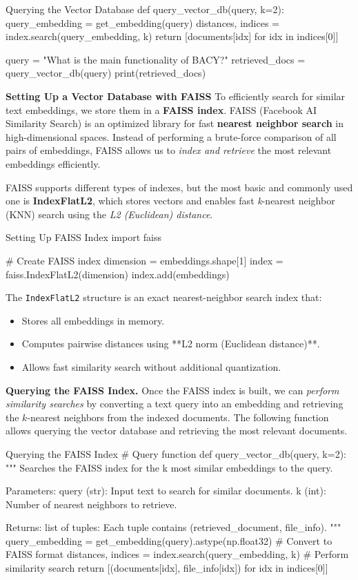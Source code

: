 \begin{codeonly}{Querying the Vector Database}
def query_vector_db(query, k=2):
    query_embedding = get_embedding(query)
    distances, indices = index.search(query_embedding, k)
    return [documents[idx] for idx in indices[0]]

query = "What is the main functionality of BACY?"
retrieved_docs = query_vector_db(query)
print(retrieved_docs)
\end{codeonly}

{\bf Setting Up a Vector Database with FAISS}
To efficiently search for similar text embeddings, we store them in a {\bf FAISS index}. FAISS (Facebook AI Similarity Search) is an optimized library for fast {\bf nearest neighbor search} in high-dimensional spaces. Instead of performing a brute-force comparison of all pairs of embeddings, FAISS allows us to {\em index and retrieve} the most relevant embeddings efficiently.

FAISS supports different types of indexes, but the most basic and commonly used one is 
\textbf{IndexFlatL2}, which stores vectors and enables fast \textit{k}-nearest neighbor (KNN) search using the {\em L2 (Euclidean) distance}.

\begin{codeonly}{Setting Up FAISS Index}
import faiss

# Create FAISS index
dimension = embeddings.shape[1]
index = faiss.IndexFlatL2(dimension)
index.add(embeddings)
\end{codeonly}

The \texttt{IndexFlatL2} structure is an exact nearest-neighbor search index that:
\begin{itemize}
    \item Stores all embeddings in memory.
    \item Computes pairwise distances using **L2 norm (Euclidean distance)**.
    \item Allows fast similarity search without additional quantization.
\end{itemize}

{\bf Querying the FAISS Index.} 
Once the FAISS index is built, we can {\em perform similarity searches} by converting a text query into an embedding and retrieving the \( k \)-nearest neighbors from the indexed documents. The following function allows querying the vector database and retrieving the most relevant documents.

\begin{codeonly}{Querying the FAISS Index}
# Query function
def query_vector_db(query, k=2):
    """
    Searches the FAISS index for the k most similar embeddings to the query.

    Parameters:
    query (str): Input text to search for similar documents.
    k (int): Number of nearest neighbors to retrieve.

    Returns:
    list of tuples: Each tuple contains (retrieved_document, file_info).
    """
    query_embedding = get_embedding(query).astype(np.float32)  # Convert to FAISS format
    distances, indices = index.search(query_embedding, k)  # Perform similarity search
    return [(documents[idx], file_info[idx]) for idx in indices[0]]
\end{codeonly}

